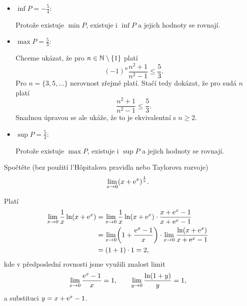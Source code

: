 \documentclass[answers]{exam}
\begin{document}
\begin{questions}
\begin{solution}
\begin{itemize}
      \item $\inf P = - \frac{5}{4}$:
      
        Protože existuje $\min P$, existuje i $\inf P$ a jejich hodnoty se rovnají.
      
      \item $\max P = \frac{5}{3}$:
      
        Chceme ukázat, že pro $n \in \mathbb{N} \setminus \{1\}$ platí 
        \begin{equation*}
          (-1)^n \frac{n^2 + 1}{n^2 - 1}
          \le
          \frac{5}{3}.
        \end{equation*}
        Pro $n = \{3, 5, \dots\}$ nerovnost zřejmě platí. Stačí tedy dokázat, že pro sudá $n$ platí
        \begin{equation*}
          \frac{n^2 + 1}{n^2 - 1}
          \le
          \frac{5}{3}.
        \end{equation*}
        Snadnou úpravou se ale ukáže, že to je ekvivalentní s $n \ge 2$.
        
      \item $\sup P = \frac{5}{3}$:
      
        Protože existuje $\max P$, existuje i $\sup P$ a jejich hodnoty se rovnají.

    \end{itemize}
  \end{solution}
  
  \question[2] Spočtěte (bez použití l'Hôpitalova pravidla nebo Taylorova rozvoje)
  \begin{equation*}
    \lim_{x \to 0} \parens{x + \exponential{x}}^{\frac{1}{x}}.
  \end{equation*}
  
  \begin{solution}
  Platí 
  \begin{align*}
    \lim_{x \to 0} \frac{1}{x} \ln \parens{x + \exponential{x}}
    &=
    \lim_{x \to 0} 
    \frac{1}{x} \ln \parens{x + \exponential{x}}
    \cdot
    \frac{x + \exponential{x} - 1}{x + \exponential{x} - 1}
    \\
    &=
    \lim_{x \to 0} \parens{1 + \frac{\exponential{x} - 1}{x}}
    \cdot
    \lim_{x \to 0} \frac{\ln \parens{x + \exponential{x}}}{x + \exponential{x} - 1}
    \\
    &=
    \parens{1 + 1} \cdot 1
    =
    2,
  \end{align*}
  kde v předposlední rovnosti jsme využili znalost limit
  \begin{equation*}
    \lim_{x \to 0} \frac{\mathrm{e}^{x} - 1}{x} = 1,
    \qquad
    \lim_{y \to 0} \frac{\ln(1 + y)}{y} = 1,
  \end{equation*}
  a substituci $y = x + \mathrm{e}^{x} - 1$.
  

\end{solution}
\end{questions}
\end{document}
